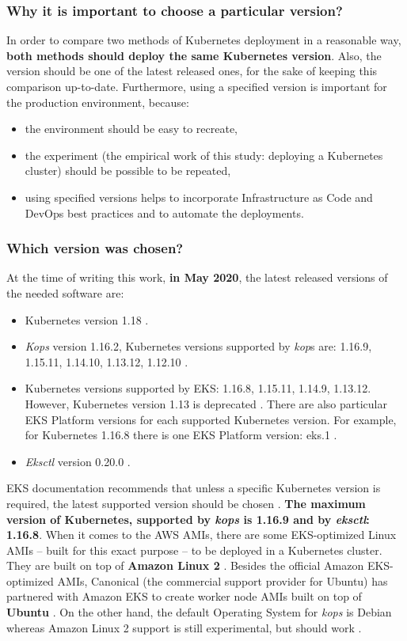 \subsubsection{Why it is important to choose a particular version?}
In order to compare two methods of Kubernetes deployment in a reasonable way, \textbf{both methods should deploy the same Kubernetes version}. Also, the version should be one of the latest released ones, for the sake of keeping this comparison up-to-date. Furthermore, using a specified version is important for the production environment, because:
\begin{itemize}
\item the environment should be easy to recreate,
\item the experiment (the empirical work of this study: deploying a Kubernetes cluster) should be possible to be repeated,
\item using specified versions helps to incorporate Infrastructure as Code and DevOps best practices and to automate the deployments.
\end{itemize}

\subsubsection{Which version was chosen?}
At the time of writing this work, \textbf{in May 2020}, the latest released versions of the needed software are:
\begin{itemize}
\item Kubernetes version 1.18 \cite{online-k8s-blog-latest}.
\item \textit{Kops} version 1.16.2, Kubernetes versions supported by \textit{kop}s are: 1.16.9, 1.15.11, 1.14.10, 1.13.12, 1.12.10 \cite{online-kops-versions2,online-kops-versions,kops-releases}.
\item Kubernetes versions supported by EKS: 1.16.8, 1.15.11, 1.14.9, 1.13.12. However, Kubernetes version 1.13 is deprecated \cite{online-eks-versions}. There are also particular EKS Platform versions for each supported Kubernetes version. For example, for Kubernetes 1.16.8 there is one EKS Platform version: eks.1 \cite{online-eks-platform-versions}.
\item \textit{Eksctl} version 0.20.0 \cite{online-eksctl-versions}.
\end{itemize}

EKS documentation recommends that unless a specific Kubernetes version is required, the latest supported version should be chosen \cite{online-eks-versions}. \textbf{The maximum version of Kubernetes, supported by \textit{kops} is 1.16.9 and by \textit{eksctl}: 1.16.8}. When it comes to the AWS AMIs, there are some EKS-optimized Linux AMIs -- built for this exact purpose -- to be deployed in a Kubernetes cluster. They are built on top of \textbf{Amazon Linux 2} \cite{eks-optimized-ami}. Besides the official Amazon EKS-optimized AMIs, Canonical (the commercial support provider for Ubuntu) has partnered with Amazon EKS to create worker node AMIs built on top of \textbf{Ubuntu} \cite{eks-ubu}. On the other hand, the default Operating System for \textit{kops} is Debian whereas Amazon Linux 2 support is still experimental, but should work \cite{online-kops-img}.

